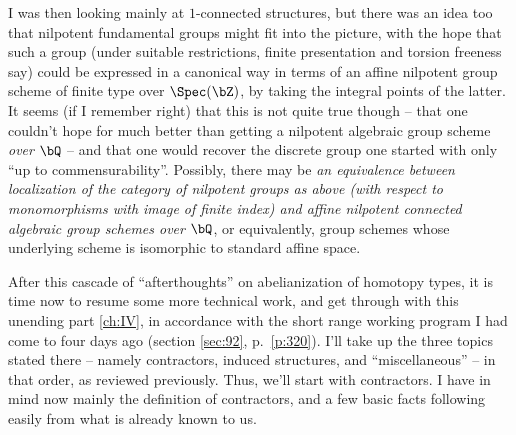 I was then looking mainly at $1$-connected structures, but there was
an idea too that nilpotent fundamental groups might fit into the
picture, with the hope that such a group (under suitable restrictions,
finite presentation and torsion freeness say) could be expressed in a
canonical way in terms of an affine nilpotent group scheme of finite
type over $\Spec(\bZ)$, by taking the integral points of the
latter. It seems (if I remember right) that this is not quite true
though -- that one couldn't hope for much better than getting a
nilpotent algebraic group scheme \emph{over $\bQ$} -- and that one
would recover the discrete group one started with only ``up to
commensurability''. Possibly, there may be \emph{an equivalence
  between localization of the category of nilpotent groups as above
  \textup(with respect to monomorphisms with image of finite
  index\textup) and affine nilpotent connected algebraic group schemes
  over $\bQ$}, or equivalently, group schemes whose underlying scheme
is isomorphic to standard affine space.

\bigbreak

\noindent\hfill{}\par

\label{sec:95}%
After this cascade of ``afterthoughts'' on abelianization of homotopy
types, it is time now to resume some more technical work, and get
through with this unending part \ref{ch:IV}, in accordance with the
short range working program I had come to four days ago (section
\ref{sec:92}, p.\ \ref{p:320}). I'll take up the three topics stated
there -- namely contractors, induced structures, and ``miscellaneous''
-- in that order, as reviewed previously. Thus, we'll start with
contractors. I have in mind now mainly the definition of contractors,
and a few basic facts following easily from what is already known to
us.

